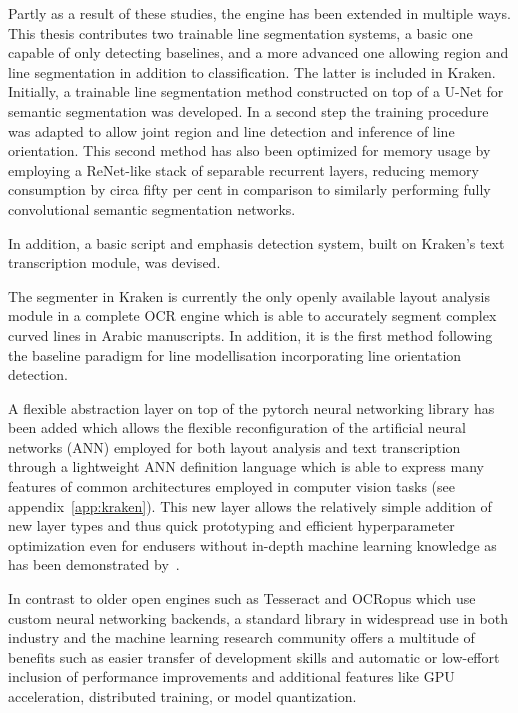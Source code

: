 Partly as a result of these studies, the engine has been extended in multiple
ways. This thesis contributes two trainable line segmentation systems, a basic
one capable of only detecting baselines, and a more advanced one allowing
region and line segmentation in addition to classification. The latter is
included in Kraken. Initially, a trainable line segmentation method constructed
on top of a U-Net for semantic segmentation was developed. In a second step the
training procedure was adapted to allow joint region and line detection and
inference of line orientation. This second method has also been optimized for
memory usage by employing a ReNet-like stack of separable recurrent layers,
reducing memory consumption by circa fifty per cent in comparison to similarly
performing fully convolutional semantic segmentation networks.

In addition, a basic script and emphasis detection system, built on Kraken’s
text transcription module, was devised.

The segmenter in Kraken is currently the only openly available layout analysis
module in a complete OCR engine which is able to accurately segment complex
curved lines in Arabic manuscripts. In addition, it is the first method
following the baseline paradigm for line modellisation incorporating line
orientation detection. 

A flexible abstraction layer on top of the pytorch neural networking library
has been added which allows the flexible reconfiguration of the artificial
neural networks (ANN) employed for both layout analysis and text transcription
through a lightweight ANN definition language which is able to express many
features of common architectures employed in computer vision tasks (see
appendix~\ref{app:kraken}). This new layer allows the relatively simple addition of
new layer types and thus quick prototyping and efficient hyperparameter
optimization even for endusers without in-depth machine learning knowledge as
has been demonstrated by~\cite{strobel2020much}. 

In contrast to older open engines such as Tesseract and OCRopus which use
custom neural networking backends, a standard library in widespread use in both
industry and the machine learning research community offers a multitude of
benefits such as easier transfer of development skills and automatic or
low-effort inclusion of performance improvements and additional features like
GPU acceleration, distributed training, or model quantization.


